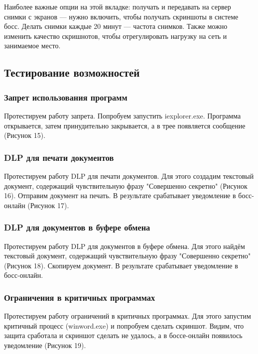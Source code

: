 \FloatBarrier

Наиболее важные опции на этой вкладке: получать и передавать на сервер снимки с экранов — нужно включить, чтобы получать скриншоты в системе босс. Делать снимки каждые 20 минут — частота снимков. Также можно изменить качество скришнотов, чтобы отрегулировать нагрузку на сеть и занимаемое место.



\clearpage


\subsection{Тестирование возможностей}

\subsubsection{Запрет использования программ}
Протестируем работу запрета. Попробуем запустить iexplorer.exe. Программа открывается, затем принудительно закрывается, а в трее появляется сообщение (Рисунок 15).
\FloatBarrier

\subsubsection{DLP для печати документов}
Протестируем работу DLP для печати документов. Для этого создадим текстовый документ, содержащий чувствительную фразу "Совершенно секретно" (Рисунок 16). Отправим документ на печать. В результате срабатывает уведомление в босс-онлайн (Рисунок 17).
\FloatBarrier

\subsubsection{DLP для документов в буфере обмена}
Протестируем работу DLP для документов в буфере обмена. Для этого найдём текстовый документ, содержащий чувствительную фразу "Совершенно секретно" (Рисунок 18). Скопируем документ. В результате срабатывает уведомление в босс-онлайн.
\FloatBarrier

\subsubsection{Ограничения в критичных программах}
Протестируем работу ограничений в критичных программах. Для этого запустим критичный процесс (winword.exe) и попробуем сделать скриншот. Видим, что защита сработала и скриншот сделать не удалось, а в боссе-онлайн появилось уведомление (Рисунок 19).
\FloatBarrier

